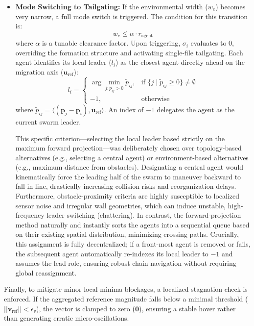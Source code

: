 \documentclass[pdflatex,sn-basic]{sn-jnl}%
\begin{document}
\begin{enumerate}
\begin{itemize}
                \item \textbf{Mode Switching to Tailgating:} If the environmental width ($w_e$) becomes very narrow, a full mode switch is triggered. The condition for this transition is:
                \begin{equation}
                    w_{e} \le \alpha \cdot r_{\text{agent}}
                \end{equation}
                where $\alpha$ is a tunable clearance factor. Upon triggering, $\sigma_i$ evaluates to $0$, overriding the formation structure and activating single-file tailgating. Each agent identifies its local leader ($l_i$) as the closest agent directly ahead on the migration axis ($\boldsymbol{u}_{\text{ref}}$):
                \begin{equation}
                    l_i = \begin{cases} \arg\min_{j:\tilde{p}_{ij}>0} \tilde{p}_{ij}, & \text{if } \{j \mid \tilde{p}_{ij} \ge 0\} \neq \emptyset \\ -1, & \text{otherwise} \end{cases}
                \end{equation}
                where $\tilde{p}_{ij} = \langle(\boldsymbol{p}_{j}-\boldsymbol{p}_{i}), \boldsymbol{u}_{\text{ref}}\rangle$. An index of $-1$ delegates the agent as the current swarm leader. 
                
                This specific criterion---selecting the local leader based strictly on the maximum forward projection---was deliberately chosen over topology-based alternatives (e.g., selecting a central agent) or environment-based alternatives (e.g., maximum distance from obstacles). Designating a central agent would kinematically force the leading half of the swarm to maneuver backward to fall in line, drastically increasing collision risks and reorganization delays. Furthermore, obstacle-proximity criteria are highly susceptible to localized sensor noise and irregular wall geometries, which can induce unstable, high-frequency leader switching (chattering). In contrast, the forward-projection method naturally and instantly sorts the agents into a sequential queue based on their existing spatial distribution, minimizing crossing paths. Crucially, this assignment is fully decentralized; if a front-most agent is removed or fails, the subsequent agent automatically re-indexes its local leader to $-1$ and assumes the lead role, ensuring robust chain navigation without requiring global reassignment.
            \end{itemize}

            Finally, to mitigate minor local minima blockages, a localized stagnation check is enforced. If the aggregated reference magnitude falls below a minimal threshold ($||\boldsymbol{v}_{\text{ref}}|| < \epsilon_v$), the vector is clamped to zero ($\boldsymbol{0}$), ensuring a stable hover rather than generating erratic micro-oscillations.
        \end{enumerate}
\end{document}
